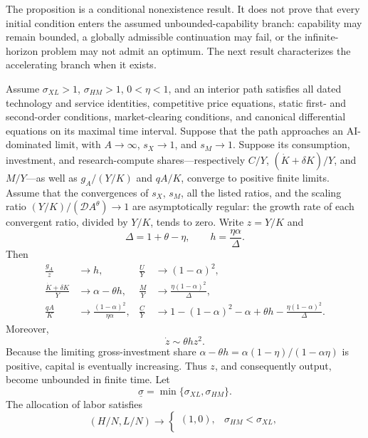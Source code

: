 The proposition is a conditional nonexistence result. It does not prove that every
initial condition enters the assumed unbounded-capability branch: capability may
remain bounded, a globally admissible continuation may fail, or the
infinite-horizon problem may not admit an optimum. The next result characterizes
the accelerating branch when it exists.

\begin{conditionalresult}
\label{prop:axm-singular-limit}
Assume \(\sigma_{XL}>1\), \(\sigma_{HM}>1\), \(0<\eta<1\), and an
interior path satisfies all dated technology and service identities, competitive
price equations, static first- and second-order conditions, market-clearing
conditions, and canonical differential equations on its maximal time interval.
Suppose that the path approaches an AI-dominated limit, with \(A\to\infty\), \(s_X\to1\),
and \(s_M\to1\). Suppose its consumption, investment, and research-compute
shares---respectively \(C/Y\),
\((\dot K+\delta K)/Y\), and \(M/Y\)---as well as \(g_A/(Y/K)\) and \(qA/K\),
converge to positive finite limits.
Assume that the convergences of \(s_X\), \(s_M\), all the listed ratios, and the scaling ratio
\((Y/K)/(\mathcal D A^\theta)\to1\) are asymptotically regular: the growth rate
of each convergent ratio, divided by \(Y/K\), tends to zero. Write \(z=Y/K\) and
\[
 \Delta=1+\theta-\eta,\qquad
 h=\frac{\eta\alpha}{\Delta}.
\]
Then
\begin{align}
 \frac{g_A}{z}&\to h,&
 \frac{U}{Y}&\to(1-\alpha)^2,\\
 \frac{\dot K+\delta K}{Y}&\to\alpha-\theta h,&
 \frac{M}{Y}&\to\frac{\eta(1-\alpha)^2}{\Delta},\\
 \frac{qA}{K}&\to\frac{(1-\alpha)^2}{\eta\alpha},&
 \frac{C}{Y}&\to
 1-(1-\alpha)^2-\alpha+\theta h
 -\frac{\eta(1-\alpha)^2}{\Delta}.
 \label{eq:axm-singular-ratios}
\end{align}
Moreover,
\begin{equation}
 \dot z\sim\theta h z^2.
 \label{eq:axm-z-law}
\end{equation}
Because the limiting gross-investment share
\(\alpha-\theta h=\alpha(1-\eta)/(1-\alpha\eta)\) is positive, capital is
eventually increasing. Thus \(z\), and consequently output, become unbounded in
finite time.
Let
\[
 \underline\sigma=\min\{\sigma_{XL},\sigma_{HM}\}.
\]
The allocation of labor satisfies
\begin{equation}
 (H/N,L/N)\to
 \begin{cases}
  (1,0),&\sigma_{HM}<\sigma_{XL},\\

\end{cases}
\end{equation}
\end{conditionalresult}
